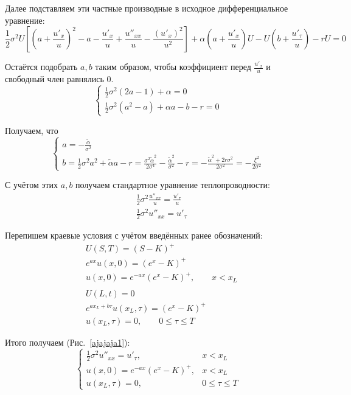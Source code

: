 \documentclass[oneside,final,12pt]{article}
\begin{document}
Далее подставляем эти частные производные в исходное дифференциальное уравнение:
$$
\frac{1}{2} \sigma^2 U \left[ \left(a+\frac{u'_x}{u}\right)^2 - a - \frac{u'_x}{u} + \frac{u''_{xx}}{u} - \frac{(u'_x)^2}{u^2}\right] + 
\alpha \left( a+\frac{u'_x}{u} \right) U - U \left( b+\frac{u'_\tau}{u}\right) - rU = 0
$$

Остаётся подобрать $a,b$ таким образом, чтобы коэффициент перед $\frac{u'_x}{u}$ и свободный член равнялись 0.
$$
\begin{cases}
\frac{1}{2}\sigma^2(2a-1)+\alpha=0 \\
\frac{1}{2}\sigma^2(a^2-a)+\alpha a - b - r = 0
\end{cases}
$$

Получаем, что
$$
\begin{cases}
a = -\frac{\widetilde{\alpha}}{\sigma^2} \\
b = \frac{1}{2}\sigma^2 a^2 + \widetilde{\alpha} a - r = \frac{\sigma^2 \widetilde{\alpha}^2}{2\sigma^4} - \frac{\widetilde{\alpha}^2}{\sigma^2} - r = -\frac{\widetilde{\alpha}^2+2r\sigma^2}{2\sigma^2} = -\frac{\xi^2}{2\sigma^2}
\end{cases}
$$

С учётом этих $a,b$ получаем стандартное уравнение теплопроводности:
\begin{align*}
    & \frac{1}{2} \sigma^2 \frac{u''_{xx}}{u} = \frac{u'_\tau}{u} \\
    & \frac{1}{2} \sigma^2 u''_{xx} = u'_\tau
\end{align*}

Перепишем краевые условия с учётом введённых ранее обозначений:
\begin{align*}
    & U(S,T)=(S-K)^+ \\
    & e^{ax} u(x,0)=(e^x-K)^+ \\
    & u(x,0) = e^{-ax} (e^x-K)^+, \qquad x<x_L \\
    & \\
    & U(L,t)=0 \\
    & e^{ax_L+b\tau} u(x_L,\tau)=(e^x-K)^+ \\
    & u(x_L,\tau) = 0, \qquad 0\leq\tau\leq T
\end{align*}

Итого получаем (Рис.~\ref{ajajaja1}):
$$
\begin{cases}
\frac{1}{2} \sigma^2 u''_{xx} = u'_\tau, &x<x_L \\
u(x,0) = e^{-ax} (e^x-K)^+ ,&x<x_L\\
u(x_L,\tau) = 0, &0\leq \tau \leq T
\end{cases}
$$
\end{document}
